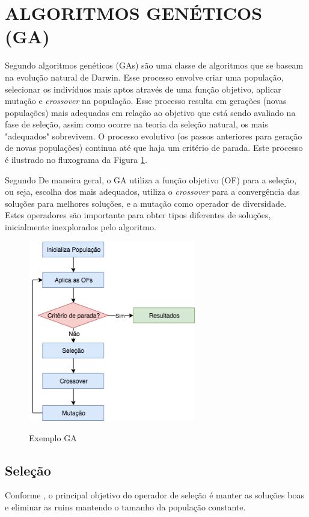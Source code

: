 \section{ALGORITMOS GENÉTICOS (GA)}
Segundo \cite{ticona} algoritmos genéticos (GAs) são uma classe de algoritmos que se baseam
na evolução natural de Darwin. Esse processo envolve criar uma população,
selecionar os indivíduos mais aptos através de uma função objetivo,
aplicar mutação e \textit{crossover} na população. 
Esse processo resulta em gerações (novas populações)
mais adequadas em relação ao objetivo que está sendo
avaliado na fase de seleção, assim como ocorre na teoria da 
seleção natural, os mais "adequados" sobrevivem. O processo evolutivo 
(os passos anteriores para geração de novas populações)
continua até que haja um critério de parada. Este processo é
ilustrado no fluxograma da Figura \ref{fig:gaalgorithm}.

Segundo \cite{ticona} De maneira geral, o GA utiliza a função objetivo (OF) para
a seleção, ou seja, escolha dos mais adequados, 
utiliza o \textit{crossover} para a convergência das soluções para melhores soluções,
e a mutação como operador de diversidade. Estes operadores são importante para
obter tipos diferentes de soluções, inicialmente inexplorados pelo algoritmo.

\begin{figure}[!htb]
  \centering
  \caption{Exemplo GA}
  \includegraphics[width=0.65\textwidth]{./dados/figuras/ga-algorithm.png}
  \label{fig:gaalgorithm}
\end{figure}

\subsection{Seleção}
Conforme \cite{ghosh}, o principal objetivo do operador de seleção é
manter as soluções boas e eliminar as ruins mantendo o tamanho da população
constante.

